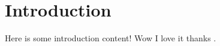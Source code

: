 \section{Introduction}
\label{sec:Introduction}

Here is some introduction content! Wow I love it thanks \cite{Bialecki2022Determinants}.
